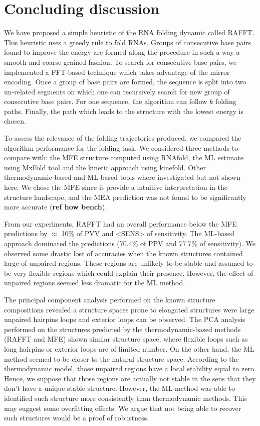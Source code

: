 \documentclass[a4paper,12pt]{article}
\begin{document}
{{\clearpage
\section{Concluding discussion}
\label{sec:org837e68f}
We have proposed a simple heuristic of the RNA folding dynamic called RAFFT.
This heuristic uses a greedy rule to fold RNAs. Groups of consecutive base pairs
found to improve the energy are formed along the procedure in such a way a
smooth and coarse grained fashion. To search for consecutive base pairs, we
implemented a FFT-based technique which takes advantage of the mirror encoding.
Once a group of base pairs are formed, the sequence is split into two un-related
segments on which one can recursively search for new group of consecutive base
pairs. For one sequence, the algorithm can follow \(k\) folding paths. Finally,
the path which leads to the structure with the lowest energy is chosen.


To assess the relevance of the folding trajectories produced, we compared the
algorithm performance for the folding task. We considered three methods to
compare with: the MFE structure computed using RNAfold, the ML estimate using
MxFold tool and the kinetic approach using kinefold. Other thermodynamic-based
and ML-based tools where investigated but not shown here. We chose the MFE since
it provide a intuitive interpretation in the structure landscape, and the MEA
prediction was not found to be significantly more accurate (\textbf{ref how bench}).

From our experiments, RAFFT had an overall performance below the MFE predictions
by \(\approx\) 10\% of PVV and <SENS> of sensitivity. The ML-based approach dominated
the predictions (70.4\% of PPV and 77.7\% of sensitivity). We observed some
drastic lost of accuracies when the known structures contained large of unpaired
regions. These regions are unlikely to be stable and assumed to be very flexible
regions which could explain their presence. However, the effect of unpaired
regions seemed less dramatic for the ML method.

The principal component analysis performed on the known structure compositions
revealed a structure spaces prone to elongated structures were large unpaired
hairpins loops and exterior loops can be observed. The PCA analysis performed on
the structures predicted by the thermodynamic-based methods (RAFFT and MFE)
shown similar structure space, where flexible loops such as long hairpins or
exterior loops are of limited number. On the other hand, the ML method seemed to
be closer to the natural structure space. According to the thermodynamic model,
those unpaired regions have a local stability equal to zero. Hence, we suppose
that those regions are actually not stable in the sens that they don't have a
unique stable structure. However, the ML-method was able to identified such
structure more consistently than thermodynamic methods. This may suggest some
overfitting effects. We argue that not being able to recover such structures
would be a proof of robustness.

}}
\end{document}
